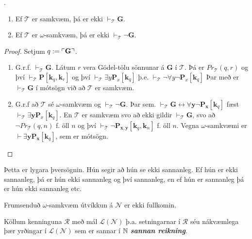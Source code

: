 \documentclass[12pt]{book}
\newcommand{\cT}{\mathcal{T}}
\newcommand{\cL}{\mathcal{L}}
\newcommand{\cN}{\mathcal{N}}
\newcommand{\cR}{\mathcal{R}}
\newcommand{\mb}[1]{\mathbf{#1}}
\newcommand{\bG}{\mathbf{G}}
\newcommand{\bx}{\mathbf{x}}
\newcommand{\bk}{\mathbf{k}}
\newcommand{\by}{\mathbf{y}}
\newcommand{\emphs}[1]{\textbf{\emph{#1}}}
\DeclarePairedDelimiter{\god}{\ulcorner}{\urcorner}
\begin{document}
\begin{setn}
  .
  \begin{enumerate}
  \item Ef $\cT$ er samkvæm, þá er ekki $\vdash_{\cT} \bG$.
  \item Ef $\cT$ er $\omega$-samkvæm, þá er ekki $\vdash_{\cT} \lnot \bG$.
  \end{enumerate}
\end{setn}

\begin{proof}
  Setjum $q := \god{\bG}$.
  \begin{enumerate}[(1)]
  \item G.r.f. $\vdash_{\cT} \bG$. Látum $r$ vera Gödel-tölu sönnunar á
    $\bG$ í $\cT$. Þá er $Pr_{\cT}(q,r)$ og því
    $\vdash_{\cT} \mb{P} [\bk_q, \bk_r]$ og því
    $\vdash_{\cT} \exists y \mb{P}_x [\bk_q]$ þ.e.
    $\vdash_{\cT} \lnot \forall y \lnot \mb{P}_x[\bk_q]$ Þar með er
    $\vdash_{\cT} \bG$ í mótsögn við að $\cT$ er samkvæm.


  \item G.r.f að $\cT$ sé $\omega$-samkvæm og  $\vdash_{\cT} \lnot \bG$. Þar sem.
    $\vdash_{\cT} \bG \leftrightarrow \forall \by \lnot \mb{P}_{\bx}[\bk_q]$ fæst
    $\vdash_{\cT} \exists \by \mb{P}_x[\bk_q]$.
    En $\cT$ er samkvæm svo að ekki gildir $\vdash_{\cT} \bG$, svo að
    $\lnot Pr_{\cT}(q,n)$ f. öll $n$ og því
    $\vdash_{\cT} \lnot \mb{P}_{\bx,\by}[\bk_q,\bk_n]$ f. öll $n$.
    Vegna $\omega$-samkvæmi er $\vdash \exists \by \mb{P}_{\bx}[\bk_q]$, sem er mótsögn.

  \end{enumerate}
\end{proof}

Þetta er lygara þversögnin. Hún segir að hún se ekki sannanleg.
Ef hún er ekki sannanleg, þá er hún ekki sannanleg og því sannanleg, en
ef hún er sannanleg þá er hún ekki sannanleg etc.




\begin{setn}[Fylgisetning]
Frumsenduð $\omega$-samkvæm útvíkkun á $\cN$ er ekki fullkomin.
\end{setn}

\begin{skgr}
  Köllum kenninguna $\cR$ með mál $\cL(\cN)$ þ.a. setningarnar í $\cR$
  séu nákvæmlega þær yrðingar í $\cL(\cN)$ sem er sannar í $\mathbb{N}$
  \emphs{sannan reikning}.
\end{skgr}
\end{document}
